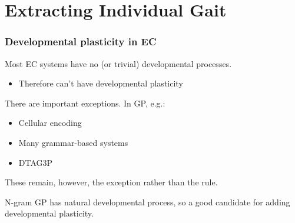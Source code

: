 \documentclass{beamer}
\newcommand{\linespace}{\vskip 0.25cm}
\begin{document}
\section[Gait Extraction]{Extracting Individual Gait}
\begin{frame}
	\frametitle{Developmental plasticity in EC}
	
	Most EC systems have no (or trivial) developmental processes.
	\begin{itemize}
		\item Therefore can't have developmental plasticity
	\end{itemize}
	
	\linespace
	
	There are important exceptions.  In GP, e.g.:
	\begin{itemize}
		\item Cellular encoding
		\item Many grammar-based systems
		\item DTAG3P
	\end{itemize}
	
	\linespace 
	
	These remain, however, the exception rather than the rule.
	
	\linespace
	
	N-gram GP has natural developmental process, so a good candidate for adding developmental plasticity.
\end{frame}
\end{document}
